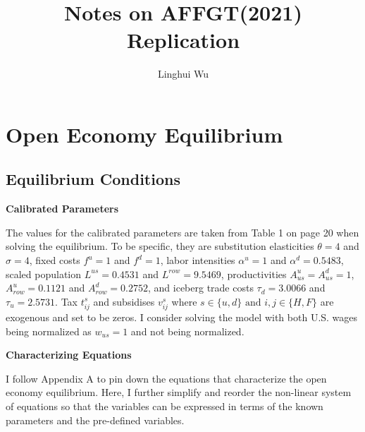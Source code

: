 \documentclass{homeworg}
\title{Notes on AFFGT(2021) Replication}
\author{Linghui Wu}
\begin{document}
\maketitle

\section{Open Economy Equilibrium}

\subsection{Equilibrium Conditions}


\textbf{Calibrated Parameters}

The values for the calibrated parameters are taken from Table 1 on page 20 when solving the equilibrium. To be specific, they are substitution elasticities $\theta = 4$ and $\sigma = 4$, fixed costs $f^{u} = 1$ and $f^{d} = 1$,  labor intensities $\alpha^{u} = 1$ and $\alpha^{d} = 0.5483$, scaled population $L^{us} = 0.4531$ and $L^{row} = 9.5469$, productivities $A^{u}_{us} = A^{d}_{us} = 1$, $A^{u}_{row} = 0.1121$ and $A^{d}_{row} = 0.2752$, and iceberg trade costs $\tau_d = 3.0066$ and $\tau_u = 2.5731$. Tax $t^{s}_{ij}$ and subsidises $v^{s}_{ij}$ where $s \in \{u, d\} \text{ and } i, j \in \{H, F\}$ are exogenous and set to be zeros. I consider solving the model with both U.S. wages being normalized as $w_{us} = 1$ and not being normalized.

\textbf{Characterizing Equations}

I follow Appendix A to pin down the equations that characterize the open economy equilibrium. Here, I further simplify and reorder the non-linear system of equations so that the variables can be expressed in terms of the known parameters and the pre-defined variables.
\end{document}
